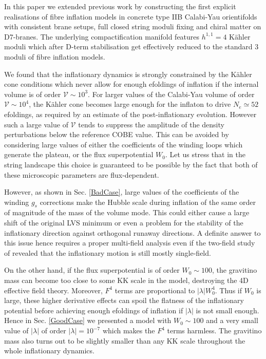\documentclass[11pt,a4paper]{article}
\newcommand\vo{{\mathcal{V}}}
\begin{document}
In this paper we extended previous work by constructing the first explicit realisations of fibre inflation models in concrete type IIB Calabi-Yau orientifolds with consistent brane setups, full closed string moduli fixing and chiral matter on D7-branes. The underlying compactification manifold features $h^{1,1}=4$ K\"ahler moduli which after D-term stabilisation get effectively reduced to the standard $3$ moduli of fibre inflation models. 

We found that the inflationary dynamics is strongly constrained by the K\"ahler cone conditions which never allow for enough efoldings of inflation if the internal volume is of order $\vo \sim 10^3$. For larger values of the Calabi-Yau volume of order $\vo\sim 10^4$, the K\"ahler cone becomes large enough for the inflaton to drive $N_e\simeq 52$ efoldings, as required by an estimate of the post-inflationary evolution. However such a large value of $\vo$ tends to suppress the amplitude of the density perturbations below the reference COBE value. This can be avoided by considering large values of either the coefficients of the winding loops which generate the plateau, or the flux superpotential $W_0$. Let us stress that in the string landscape this choice is guaranteed to be possible by the fact that both of these microscopic parameters are flux-dependent.

However, as shown in Sec. \ref{BadCase}, large values of the coefficients of the winding $g_s$ corrections make the Hubble scale during inflation of the same order of magnitude of the mass of the volume mode. This could either cause a large shift of the original LVS minimum or even a problem for the stability of the inflationary direction against orthogonal runaway directions. A definite answer to this issue hence requires a proper multi-field analysis even if the two-field study of \cite{Cicoli:2008gp} revealed that the inflationary motion is still mostly single-field. 

On the other hand, if the flux superpotential is of order $W_0\sim 100$, the gravitino mass can become too close to some KK scale in the model, destroying the 4D effective field theory. Moreover, $F^4$ terms are proportional to $|\lambda| W_0^4$. Thus if $W_0$ is large, these higher derivative effects can spoil the flatness of the inflationary potential before achieving enough efoldings of inflation if $|\lambda|$ is not small enough. Hence in Sec. \ref{GoodCase} we presented a model with $W_0\sim 100$ and a very small value of $|\lambda|$ of order $|\lambda|=10^{-7}$ which makes the $F^4$ terms harmless. The gravitino mass also turns out to be slightly smaller than any KK scale throughout the whole inflationary dynamics. 
\end{document}
